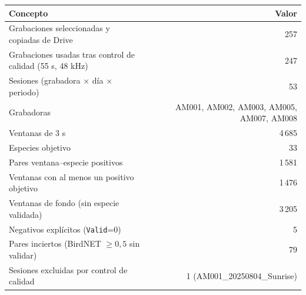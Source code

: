 \begin{tabular}{lr}
\toprule
Concepto & Valor\\
\midrule
Grabaciones seleccionadas y copiadas de Drive & 257\\
Grabaciones usadas tras control de calidad (55 s, 48 kHz) & 247\\
Sesiones (grabadora $\times$ día $\times$ periodo) & 53\\
Grabadoras & AM001, AM002, AM003, AM005, AM007, AM008\\
Ventanas de 3 s & 4\,685\\
Especies objetivo & 33\\
Pares ventana--especie positivos & 1\,581\\
Ventanas con al menos un positivo objetivo & 1\,476\\
Ventanas de fondo (sin especie validada) & 3\,205\\
Negativos explícitos (\texttt{Valid}=0) & 5\\
Pares inciertos (BirdNET $\geq 0{,}5$ sin validar) & 79\\
Sesiones excluidas por control de calidad & 1 (AM001\_20250804\_Sunrise)\\
\bottomrule
\end{tabular}
